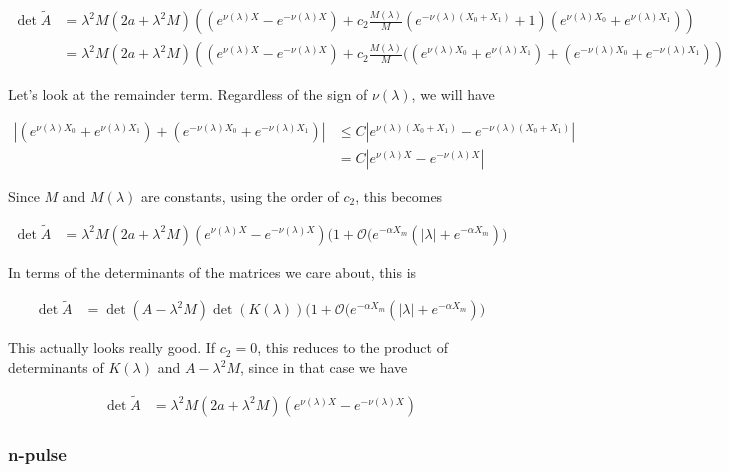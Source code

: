 \documentclass[12pt]{article}
\begin{document}
\begin{align*}
\det{\tilde{A}}
&= \lambda^2 M (2 a + \lambda^2 M) \left( 
(e^{\nu(\lambda)X} - e^{-\nu(\lambda)X}) + c_2 \frac{M(\lambda)}{M}(e^{-\nu(\lambda)(X_0 + X_1)} + 1) (e^{\nu(\lambda) X_0} + e^{\nu(\lambda) X_1})  \right) \\
&= \lambda^2 M (2 a + \lambda^2 M) \left( 
(e^{\nu(\lambda)X} - e^{-\nu(\lambda)X}) + c_2 \frac{M(\lambda)}{M}((e^{\nu(\lambda)X_0} + e^{\nu(\lambda)X_1}) + (e^{-\nu(\lambda) X_0} + e^{-\nu(\lambda) X_1}) \right) 
\end{align*}

Let's look at the remainder term. Regardless of the sign of $\nu(\lambda)$, we will have

\begin{align*}
|(e^{\nu(\lambda)X_0} + e^{\nu(\lambda)X_1}) + (e^{-\nu(\lambda) X_0} + e^{-\nu(\lambda) X_1})| &\leq C |e^{\nu(\lambda)(X_0 + X_1)} - e^{-\nu(\lambda)(X_0 + X_1)}| \\
&= C |e^{\nu(\lambda)X} - e^{-\nu(\lambda)X}|
\end{align*}

Since $M$ and $M(\lambda)$ are constants, using the order of $c_2$, this becomes

\begin{align*}
\det{\tilde{A}}
&= \lambda^2 M (2 a + \lambda^2 M) 
(e^{\nu(\lambda)X} - e^{-\nu(\lambda)X})\Big(1 + \mathcal{O}(e^{-\alpha X_m}(|\lambda| + e^{-\alpha X_m}) \Big)
\end{align*}

In terms of the determinants of the matrices we care about, this is

\begin{align}\label{tildeA2}
\det{\tilde{A}}
&= \det(A - \lambda^2 M) \det(K(\lambda))\Big(1 + \mathcal{O}(e^{-\alpha X_m}(|\lambda| + e^{-\alpha X_m}) \Big)
\end{align}

This actually looks really good. If $c_2 = 0$, this reduces to the product of determinants of $K(\lambda)$ and $A - \lambda^2 M$, since in that case we have

\begin{align*}
\det{\tilde{A}} 
&= \lambda^2 M (2 a + \lambda^2 M)(e^{\nu(\lambda)X} - e^{-\nu(\lambda)X})
\end{align*}

\subsubsection{n-pulse}
\end{document}
